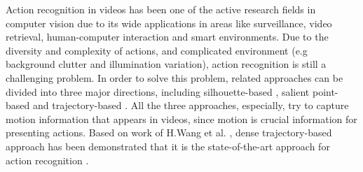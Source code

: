 \documentclass[review]{elsarticle}
\begin{document}
Action recognition in videos has been one of the active research fields in computer vision \cite{pirsiavash2012detecting, poppe2010survey} due to its wide applications in areas like surveillance, video retrieval, human-computer interaction and smart environments.
Due to the diversity and complexity of actions, and complicated environment (e.g background clutter and illumination variation), action recognition is still a challenging problem.
In order to solve this problem, related approaches can be divided into three major directions, including silhouette-based \cite{blank2005actions, ke2007event, vitaladevuni2008action, yilmaz2005actions}, salient point-based \cite{laptev2005space, dollar2005behavior, laptev2008learning, bregonzio2009recognising, klaser2008aspatiotemporal, willems2008efficient} and trajectory-based \cite{matikainen2009trajectons, messing2009activity, sun2009hierarchical}.
All the three approaches, especially, try to capture motion information that appears in videos, since motion is crucial information for presenting actions.
Based on work of H.Wang et al. \cite{wang2011densetraj}, dense trajectory-based approach has been demonstrated that it is the state-of-the-art approach for action recognition \cite{phan2014multimedia, oneata2012axes, natarajan2012bbn}.
\end{document}

